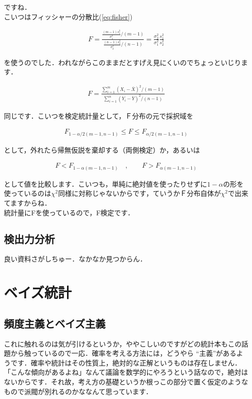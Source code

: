 \documentclass[11pt,a4paper,uplatex]{ujreport} 	%
\begin{document}
ですね．\\

こいつはフィッシャーの分散比(\ref{eq:fisher})

\begin{align}
  F = \frac{\frac{(m-1)s_1^2}{\sigma_1^2} / (m-1)}{\frac{(n-1)s_2^2}{\sigma_2^2} / (n-1)} = \frac{\sigma_2^2}{\sigma_1^2}\frac{s_1^2}{s_2^2}
\end{align}

を使うのでした．われながらこのままだとすげえ見にくいのでちょっといじります．

\begin{align}
  F = \frac{\sum_{i=1}^m (X_i - \bar{X})^2/(m-1)}{\sum_{i=1}^n (Y_i - \bar{Y})^2/(n-1)}
\end{align}

同じです．こいつを検定統計量として，Ｆ分布の元で採択域を

\begin{align}
  F_{1-\alpha/2(m-1,n-1)} \leq F \leq F_{\alpha/2(m-1,n-1)}
\end{align}

として，外れたら帰無仮説を棄却する（両側検定）か，あるいは

\begin{align}
  F < F_{1-\alpha(m-1,n-1)} \quad , \qquad F>F_{\alpha(m-1,n-1)}
\end{align}

として値を比較します．こいつも，単純に絶対値を使ったりせずに$1-\alpha$の形を使っているのは$\chi^2$同様に対称じゃないからです，ていうかＦ分布自体が$\chi^2$で出来てますからね．\\

統計量にFを使っているので，F検定です．

\section{検出力分析}

良い資料さがしちゅー．なかなか見つからん．




\newpage
\chapter{ベイズ統計}
\section{頻度主義とベイズ主義}
これに触れるのは気が引けるというか，ややこしいのですがどの統計本もこの話題から触っているので一応．確率を考える方法には，どうやら ``主義''があるようです．確率や統計はその性質上，絶対的な正解というものは存在しません．「こんな傾向があるよね」なんて議論を数学的にやろうという話なので，絶対はないからです．それ故，考え方の基礎というか根っこの部分で置く仮定のようなもので派閥が別れるのかななんて思っています．\\
\end{document}
